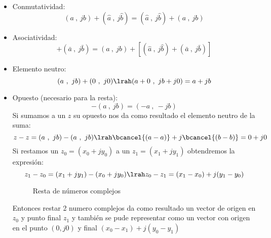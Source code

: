     \begin{itemize}
        \item Conmutatividad:
        \begin{equation}
            (a\ ,\ jb)+(\hat{a}\ ,\ j\hat{b})=(\hat{a}\ ,\ j\hat{b})+(a\ ,\ jb)
        \end{equation}
        \item Asociatividad:
        \begin{equation}
            [(a\ ,\ jb)+(\hat{a}\ ,\ j\hat{b})]+(\bar{a}\ ,\ j\bar{b})=(a\ ,\ jb)+[(\hat{a}\ ,\ j\hat{b})+(\bar{a}\ ,\ j\bar{b})]
        \end{equation}
        \item Elemento neutro:
        \begin{equation}
             (a\ ,\ jb)+(0\ ,\ j0) \lrah (a+0\ ,\ jb+j0)=a+jb 
        \end{equation}
        \item Opuesto (necesario para la resta):
        \begin{equation}
            -(a\ ,\ jb)=(-a\ ,\ -jb)
        \end{equation}
        Si sumamos a un $z$ su opuesto nos da como resultado el elemento neutro de la suma:
         \begin{equation}
            z-z=(a\ ,\ jb)-(a\ ,\ jb)\lrah \bcancel{(a-a)}+j\bcancel{(b-b)} = 0+j0
        \end{equation}
        Si restamos un $z_0=(x_0+jy_0)$ a un $z_1=(x_1+jy_1)$ obtendremos la expresión:
        \begin{equation}
            z_1-z_0=(x_1+jy_1)-(x_0+jy_0) \lrah z_0-z_1=(x_1-x_0)+j(y_1-y_0)
        \end{equation}
        \begin{figure}[H]
            \centering
            \begin{minipage}{0.4\textwidth}
            \centering
                
            \end{minipage}%
            \begin{minipage}{0.4\textwidth}
            \centering
                
            \end{minipage}
            \caption{Resta de números complejos}
            \label{fig:RestC}
        \end{figure}
        Entonces restar 2 numero complejos da como resultado un vector de origen en $z_0$ y punto final $z_1$ y también se pude representar como un vector con origen en el punto $(0,j0)$ y final $(x_0-x_1)+j(y_0-y_1)$
    \end{itemize}
